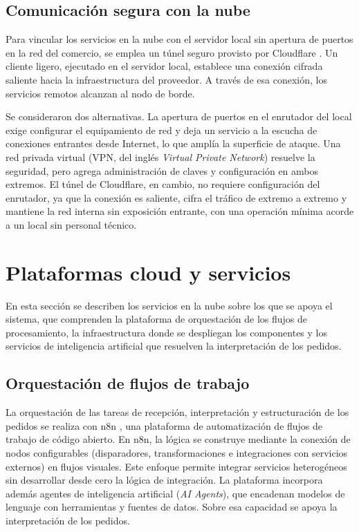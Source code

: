 \subsection{Comunicación segura con la nube}
\label{subsec:cloudflare}

Para vincular los servicios en la nube con el servidor local sin apertura de puertos en la red del comercio, se emplea un túnel seguro provisto por Cloudflare \cite{cloudflaretunnel}. Un cliente ligero, ejecutado en el servidor local, establece una conexión cifrada saliente hacia la infraestructura del proveedor. A través de esa conexión, los servicios remotos alcanzan al nodo de borde.

Se consideraron dos alternativas. La apertura de puertos en el enrutador del local exige configurar el equipamiento de red y deja un servicio a la escucha de conexiones entrantes desde Internet, lo que amplía la superficie de ataque. Una red privada virtual (VPN, del inglés \textit{Virtual Private Network}) resuelve la seguridad, pero agrega administración de claves y configuración en ambos extremos. El túnel de Cloudflare, en cambio, no requiere configuración del enrutador, ya que la conexión es saliente, cifra el tráfico de extremo a extremo y mantiene la red interna sin exposición entrante, con una operación mínima acorde a un local sin personal técnico.


\section{Plataformas cloud y servicios}
\label{sec:plataformas_cloud}

En esta sección se describen los servicios en la nube sobre los que se apoya el sistema, que comprenden la plataforma de orquestación de los flujos de procesamiento, la infraestructura donde se despliegan los componentes y los servicios de inteligencia artificial que resuelven la interpretación de los pedidos.

\subsection{Orquestación de flujos de trabajo}
\label{subsec:n8n}

La orquestación de las tareas de recepción, interpretación y estructuración de los pedidos se realiza con n8n \cite{n8n}, una plataforma de automatización de flujos de trabajo de código abierto. En n8n, la lógica se construye mediante la conexión de nodos configurables (disparadores, transformaciones e integraciones con servicios externos) en flujos visuales. Este enfoque permite integrar servicios heterogéneos sin desarrollar desde cero la lógica de integración. La plataforma incorpora además agentes de inteligencia artificial (\textit{AI Agents}), que encadenan modelos de lenguaje con herramientas y fuentes de datos. Sobre esa capacidad se apoya la interpretación de los pedidos.

